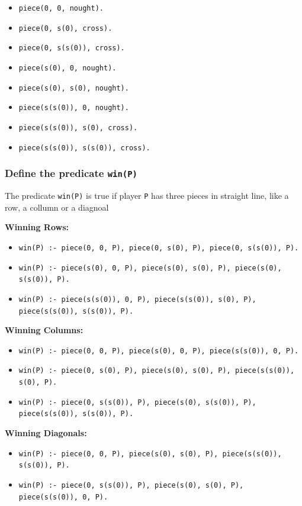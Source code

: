 \documentclass[10pt, a4paper]{article}
\begin{document}
\begin{itemize}
    \item \texttt{piece(0, 0, nought).}
    \item \texttt{piece(0, s(0), cross).}
    \item \texttt{piece(0, s(s(0)), cross).}
    \item \texttt{piece(s(0), 0, nought).}
    \item \texttt{piece(s(0), s(0), nought).}
    \item \texttt{piece(s(s(0)), 0, nought).}
    \item \texttt{piece(s(s(0)), s(0), cross).}
    \item \texttt{piece(s(s(0)), s(s(0)), cross).}
\end{itemize}

\subsubsection{Define the predicate \texttt{win(P)}}
The predicate \texttt{win(P)} is true if player \texttt{P} has three pieces in straight line, like a row, a collumn or a diagnoal

\textbf{Winning Rows:}
\begin{itemize}
    \item \texttt{win(P) :- piece(0, 0, P), piece(0, s(0), P), piece(0, s(s(0)), P).} 
    \item \texttt{win(P) :- piece(s(0), 0, P), piece(s(0), s(0), P), piece(s(0), s(s(0)), P).} 
    \item \texttt{win(P) :- piece(s(s(0)), 0, P), piece(s(s(0)), s(0), P), piece(s(s(0)), s(s(0)), P).}
\end{itemize}

\textbf{Winning Columns:}
\begin{itemize}
    \item \texttt{win(P) :- piece(0, 0, P), piece(s(0), 0, P), piece(s(s(0)), 0, P).} 
    \item \texttt{win(P) :- piece(0, s(0), P), piece(s(0), s(0), P), piece(s(s(0)), s(0), P).} 
    \item \texttt{win(P) :- piece(0, s(s(0)), P), piece(s(0), s(s(0)), P), piece(s(s(0)), s(s(0)), P).}
\end{itemize}

\textbf{Winning Diagonals:}
\begin{itemize}
    \item \texttt{win(P) :- piece(0, 0, P), piece(s(0), s(0), P), piece(s(s(0)), s(s(0)), P).}
    \item \texttt{win(P) :- piece(0, s(s(0)), P), piece(s(0), s(0), P), piece(s(s(0)), 0, P).}
\end{itemize}
\end{document}

